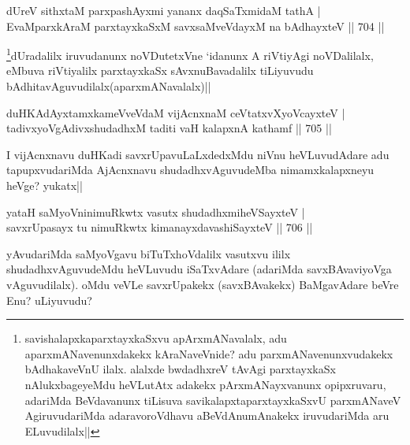 
\begin{shl}
dUreV sithxtaM parxpashAyxmi yananx daqSaTxmidaM tathA | \\
EvaMparxkAraM parxtayxkaSxM savxsaMveVdayxM na bAdhayxteV \hfill||  704 ||  
\end{shl}

\begin{artha}
\footnote{savishalapxkaparxtayxkaSxvu apArxmANavalalx, adu  aparxmANavenunxdakekx kAraNaveVnide? adu parxmANavenunxvudakekx bAdhakaveVnU ilalx. alalxde bwdadhxreV tAvAgi parxtayxkaSx nAlukxbageyeMdu heVLutAtx adakekx pArxmANayxvanunx opipxruvaru, adariMda BeVdavanunx tiLisuva savikalapxtaparxtayxkaSxvU parxmANaveV AgiruvudariMda adaravoroVdhavu aBeVdAnumAnakekx iruvudariMda aru ELuvudilalx||}dUradalilx iruvudanunx noVDutetxVne `idanunx A riVtiyAgi noVDalilalx, eMbuva riVtiyalilx parxtayxkaSx sAvxnuBavadalilx tiLiyuvudu bAdhitavAguvudilalx(aparxmANavalalx)||
\end{artha}


\begin{shl}
duHKAdAyxtamxkameVveVdaM vijAcnxnaM ceVtatxvXyoVcayxteV | \\
tadivxyoVgAdivxshudadhxM taditi vaH kalapxnA kathamf \hfill||  705 ||  
\end{shl}

\begin{artha}
I vijAcnxnavu duHKadi savxrUpavuLaLxdedxMdu niVnu heVLuvudAdare adu tapupxvudariMda AjAcnxnavu shudadhxvAguvudeMba nimamxkalapxneyu heVge? yukatx||
\end{artha}


\begin{shl}
yataH saMyoVninimuRkwtx vasutx shudadhxmiheVSayxteV | \\
savxrUpasayx tu nimuRkwtx kimanayxdavashiSayxteV \hfill||  706 ||  
\end{shl}

\begin{artha}
yAvudariMda saMyoVgavu biTuTxhoVdalilx vasutxvu ililx shudadhxvAguvudeMdu heVLuvudu iSaTxvAdare (adariMda savxBAvaviyoVga vAguvudilalx). oMdu veVLe savxrUpakekx (savxBAvakekx) BaMgavAdare beVre Enu? uLiyuvudu?
\end{artha}

